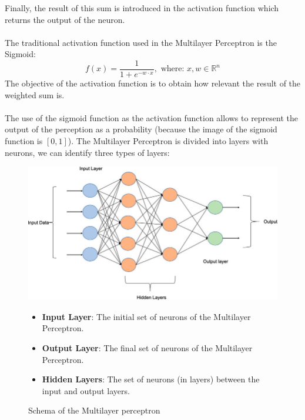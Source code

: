 \documentclass[a4paper, 11pt]{article}
\begin{document}
Finally, the result of this sum is introduced in the activation function which returns the output of the neuron.\\
\textcolor{white}{a}\\
The traditional activation function used in the Multilayer Perceptron is the Sigmoid: 
$$f(x) = \frac{1}{1+e^{-w\cdot x}},\text{ where: } x,w\in\mathbb{R}^n$$
The objective of the activation function is to obtain how relevant the result of the weighted sum is.\\
\textcolor{white}{a}\\
The use of the sigmoid function as the activation function allows to represent the output of the perception as a probability (because the image of the sigmoid function is $[0,1]$).
\newpage
\hspace{-1.6em}The Multilayer Perceptron is divided into layers with neurons, we can identify three types of layers:
\begin{figure}[h]
    \begin{minipage}{9cm}
        \includegraphics[width = 1 \textwidth]{Neural_Network/Multi-layer-perceptron-MLP-NN-basic-Architecture.png}
        \caption{Schema of the Multilayer perceptron}
    \end{minipage}
    \hspace{1em}
    \begin{minipage}{5cm}
        \begin{itemize}
            \item \textbf{Input Layer}: The initial set of neurons of the Multilayer Perceptron.
            \item \textbf{Output Layer}: The final set of neurons of the Multilayer Perceptron.
            \item \textbf{Hidden Layers}: The set of neurons (in layers) between the input and output layers.
        \end{itemize}
    \end{minipage}
\end{figure}\\
\end{document}
